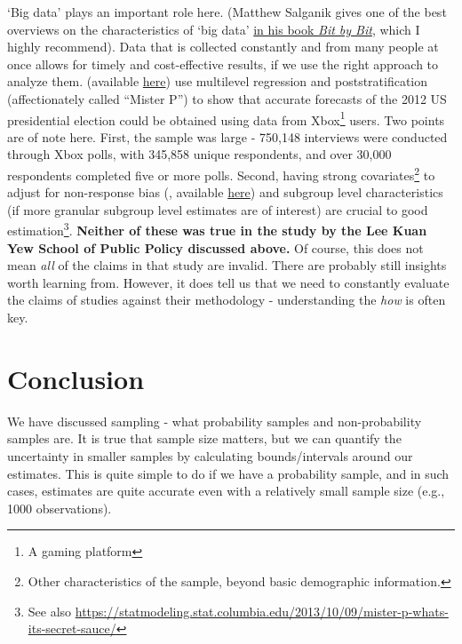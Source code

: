 \documentclass[
  openany]{book}
\begin{document}
`Big data' plays an important role here. (Matthew Salganik gives one of the best overviews on the characteristics of `big data' \href{https://www.bitbybitbook.com/en/1st-ed/observing-behavior/characteristics/}{in his book \emph{Bit by Bit}}, which I highly recommend). Data that is collected constantly and from many people at once allows for timely and cost-effective results, if we use the right approach to analyze them. \citet{wang_forecasting_2015} (available \href{http://www.stat.columbia.edu/~gelman/research/published/forecasting-with-nonrepresentative-polls.pdf}{here}) use multilevel regression and poststratification (affectionately called ``Mister P'') to show that accurate forecasts of the 2012 US presidential election could be obtained using data from Xbox\footnote{A gaming platform} users. Two points are of note here. First, the sample was large - 750,148 interviews were conducted through Xbox polls, with 345,858 unique respondents, and over 30,000 respondents completed five or more polls. Second, having strong covariates\footnote{Other characteristics of the sample, beyond basic demographic information.} to adjust for non-response bias (\citet{gelman_mythical_2016}, available \href{http://www.stat.columbia.edu/~gelman/research/published/swingers.pdf}{here}) and subgroup level characteristics (if more granular subgroup level estimates are of interest) are crucial to good estimation\footnote{See also \url{https://statmodeling.stat.columbia.edu/2013/10/09/mister-p-whats-its-secret-sauce/}}. \textbf{Neither of these was true in the study by the Lee Kuan Yew School of Public Policy discussed above.} Of course, this does not mean \emph{all} of the claims in that study are invalid. There are probably still insights worth learning from. However, it does tell us that we need to constantly evaluate the claims of studies against their methodology - understanding the \emph{how} is often key.

\hypertarget{conclusion-2}{%
\section{Conclusion}\label{conclusion-2}}

We have discussed sampling - what probability samples and non-probability samples are. It is true that sample size matters, but we can quantify the uncertainty in smaller samples by calculating bounds/intervals around our estimates. This is quite simple to do if we have a probability sample, and in such cases, estimates are quite accurate even with a relatively small sample size (e.g., 1000 observations).
\end{document}
